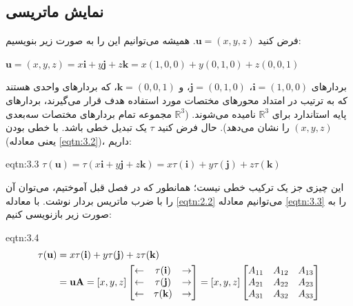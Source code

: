 \subsection{\textbf{نمایش ماتریسی}}
\label{subsec:3.1.2}
{
    \Large
    \begin{spacing}{1.5}
        فرض کنید $\textbf{u}=(x,y,z)$.
        همیشه می‌توانیم این را به صورت زیر بنویسیم:

        \begin{center}
            $\textbf{u}=(x,y,z)=x\textbf{i}+y\textbf{j}+z\textbf{k}=x(1,0,0)+y(0,1,0)+z(0,0,1)$
        \end{center}

        بردارهای $\textbf{i}=(1,0,0)$، $\textbf{j}=(0,1,0)$، و $\textbf{k}=(0,0,1)$، که بردارهای واحدی هستند
        که به ترتیب در امتداد محورهای مختصات مورد استفاده هدف قرار می‌گیرند، بردارهای پایه استاندارد برای $\mathbb{R}^3$ نامیده می‌شوند.
        ($\mathbb{R}^3$ مجموعه تمام بردارهای مختصات سه‌بعدی $(x, y, z)$ را نشان می‌دهد).
        حال فرض کنید $\tau$ یک تبدیل خطی باشد.
        با خطی بودن (یعنی معادله \ref{eqtn:3.2})، داریم:

        \begin{eqtn}{eqtn:3.3}
            \centering
            $\tau(\textbf{u})=\tau(x\textbf{i}+y\textbf{j}+z\textbf{k})=x\tau(\textbf{i})+y\tau(\textbf{j})+z\tau(\textbf{k})$
        \end{eqtn}

        این چیزی جز یک ترکیب خطی نیست؛ همانطور که در فصل قبل آموختیم، می‌توان آن را با ضرب ماتریس بردار نوشت.
        با معادله \ref{eqtn:2.2} می‌توانیم معادله \ref{eqtn:3.3} را به صورت زیر بازنویسی کنیم:

        \begin{eqtn}{eqtn:3.4}
            \centering
            \begin{equation*}
                \centering
                \begin{split}
                    \tau(\textbf{u})&=x\tau(\textbf{i})+y\tau(\textbf{j})+z\tau(\textbf{k}) \\
                    &=\textbf{uA}=[x,y,z]\begin{bmatrix}
                                             \leftarrow & \tau(\textbf{i}) & \rightarrow \\
                                             \leftarrow & \tau(\textbf{j}) & \rightarrow \\
                                             \leftarrow & \tau(\textbf{k}) & \rightarrow
                    \end{bmatrix}=[x,y,z]\begin{bmatrix}
                                             A_{11} & A_{12} & A_{13} \\
                                             A_{21} & A_{22} & A_{23} \\
                                             A_{31} & A_{32} & A_{33}
                    \end{bmatrix}
                \end{split}
            \end{equation*}


\end{eqtn}
\end{spacing}}
